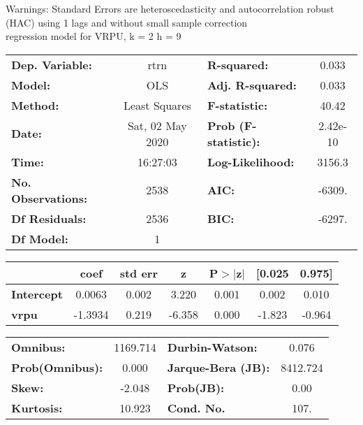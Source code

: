 Warnings: \newline
 [1] Standard Errors are heteroscedasticity and autocorrelation robust (HAC) using 1 lags and without small sample correction\\ 

regression model for VRPU, k = 2 h = 9\begin{center}
\begin{tabular}{lclc}
\toprule
\textbf{Dep. Variable:}    &       rtrn       & \textbf{  R-squared:         } &     0.033   \\
\textbf{Model:}            &       OLS        & \textbf{  Adj. R-squared:    } &     0.033   \\
\textbf{Method:}           &  Least Squares   & \textbf{  F-statistic:       } &     40.42   \\
\textbf{Date:}             & Sat, 02 May 2020 & \textbf{  Prob (F-statistic):} &  2.42e-10   \\
\textbf{Time:}             &     16:27:03     & \textbf{  Log-Likelihood:    } &    3156.3   \\
\textbf{No. Observations:} &        2538      & \textbf{  AIC:               } &    -6309.   \\
\textbf{Df Residuals:}     &        2536      & \textbf{  BIC:               } &    -6297.   \\
\textbf{Df Model:}         &           1      & \textbf{                     } &             \\
\bottomrule
\end{tabular}
\begin{tabular}{lcccccc}
                   & \textbf{coef} & \textbf{std err} & \textbf{z} & \textbf{P$> |$z$|$} & \textbf{[0.025} & \textbf{0.975]}  \\
\midrule
\textbf{Intercept} &       0.0063  &        0.002     &     3.220  &         0.001        &        0.002    &        0.010     \\
\textbf{vrpu}      &      -1.3934  &        0.219     &    -6.358  &         0.000        &       -1.823    &       -0.964     \\
\bottomrule
\end{tabular}
\begin{tabular}{lclc}
\textbf{Omnibus:}       & 1169.714 & \textbf{  Durbin-Watson:     } &    0.076  \\
\textbf{Prob(Omnibus):} &   0.000  & \textbf{  Jarque-Bera (JB):  } & 8412.724  \\
\textbf{Skew:}          &  -2.048  & \textbf{  Prob(JB):          } &     0.00  \\
\textbf{Kurtosis:}      &  10.923  & \textbf{  Cond. No.          } &     107.  \\
\bottomrule
\end{tabular}
\end{center}


